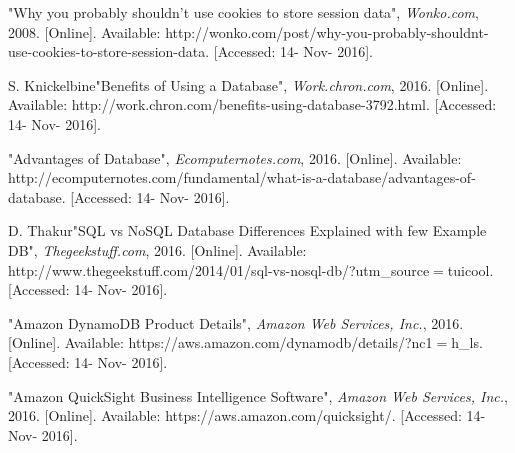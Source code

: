 \documentclass[10pt,draftclsnofoot,onecolumn,journal,compsoc]{IEEEtran}
\begin{document}
\begin{thebibliography}{1}
        "Why you probably shouldn't use cookies to store session data", \textit{Wonko.com}, 2008. [Online]. Available: http://wonko.com/post/why-you-probably-shouldnt-use-cookies-to-store-session-data. [Accessed: 14- Nov- 2016].
        
        S. Knickelbine"Benefits of Using a Database", \textit{Work.chron.com}, 2016. [Online]. Available: http://work.chron.com/benefits-using-database-3792.html. [Accessed: 14- Nov- 2016].
        
        "Advantages of Database", \textit{Ecomputernotes.com}, 2016. [Online]. Available: http://ecomputernotes.com/fundamental/what-is-a-database/advantages-of-database. [Accessed: 14- Nov- 2016].
        
        D. Thakur"SQL vs NoSQL Database Differences Explained with few Example DB", \textit{Thegeekstuff.com}, 2016. [Online]. Available: http://www.thegeekstuff.com/2014/01/sql-vs-nosql-db/?utm\_source$=$tuicool. [Accessed: 14- Nov- 2016].
        
        "Amazon DynamoDB Product Details", \textit{Amazon Web Services, Inc.}, 2016. [Online]. Available: https://aws.amazon.com/dynamodb/details/?nc1{$=$}h\_ls. [Accessed: 14- Nov- 2016].
        
        "Amazon QuickSight Business Intelligence Software", \textit{Amazon Web Services, Inc.}, 2016. [Online]. Available: https://aws.amazon.com/quicksight/. [Accessed: 14- Nov- 2016].
  
    \end{thebibliography}
        
\end{document}
